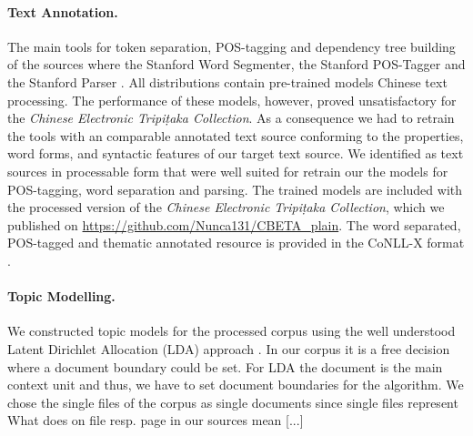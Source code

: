 \documentclass[a4paper,10pt]{article}
\newcommand{\TODO}[1]{\begingroup\color{red}#1\endgroup}
\begin{document}
\paragraph{Text Annotation.} 
The main tools for token separation, POS-tagging and dependency tree building of the sources where
the Stanford Word Segmenter, the Stanford POS-Tagger and the Stanford Parser
\cite{manning:2014}.  All distributions contain pre-trained models Chinese
text processing. The performance of these models, however, proved
unsatisfactory for the \textit{Chinese Electronic Tripi{\d{t}}aka
  Collection}. As a consequence we had to
retrain the tools with an comparable annotated text source conforming to
the properties, word forms, and syntactic features of our target
text source.  We identified  as text
sources in processable form that were well suited for retrain our the
models for POS-tagging, word separation and parsing. The trained models are included
with the processed version of the \textit{Chinese Electronic
  Tripi{\d{t}}aka Collection}, which we published on \url{https://github.com/Nunca131/CBETA_plain}. The word separated, POS-tagged and thematic annotated resource is provided in the CoNLL-X format \cite{Buchholz:2006}.

\paragraph{Topic Modelling.}
  We constructed topic models for the processed corpus using the well
  understood Latent Dirichlet Allocation (LDA) approach 
  \cite{blei:2012,griffiths:2004}. In our corpus it is a free decision where 
  a document boundary could be set.  For LDA the document is the main context 
  unit and thus, we have to set document boundaries for the algorithm. We chose the single files of the corpus as single documents since single files represent \TODO{What does on file resp. page in our sources mean} [...]
\end{document}
